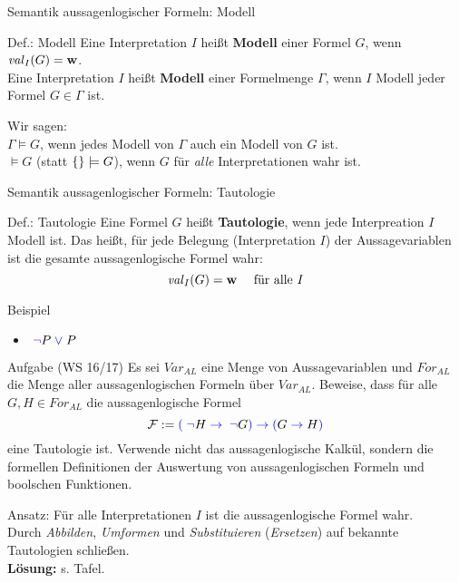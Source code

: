\begin{frame}{Semantik aussagenlogischer Formeln: Modell}
	\begin{block}{Def.: Modell}
		Eine Interpretation $I$ heißt \textbf{Modell} einer Formel $G$, wenn $\hbox{\textit{val}}_I(G)=\mathbf{w}$.\\[2ex]

		Eine Interpretation $I$ heißt \textbf{Modell} einer Formelmenge $\Gamma$, wenn $I$ Modell jeder Formel $G\in \Gamma$ ist.
	\end{block}

	\begin{exampleblock}{}
	Wir sagen:\\
	\textcolor{black!50!red}{$\Gamma \models G$}, wenn jedes Modell von $\Gamma$ auch ein Modell von $G$ ist.\\
	\textcolor{black!50!red}{$\models G$} (statt \textcolor{black!50!red}{$\{  \}\models G$}), wenn $G$ für \emph{alle} Interpretationen wahr ist.
	\end{exampleblock}
\end{frame}

\begin{frame}{Semantik aussagenlogischer Formeln: Tautologie}
	\begin{block}{Def.: Tautologie}
		Eine Formel $G$ heißt \textbf{Tautologie}, wenn jede Interpreation $I$ Modell ist. Das heißt, für jede Belegung (Interpretation $I$) der Aussagevariablen ist die gesamte aussagenlogische Formel wahr:
			\[	\hbox{\textit{val}}_I(G)=\mathbf{w} \quad \text{ für alle } I	\]
	\end{block}

	\begin{exampleblock}{Beispiel}
		\begin{itemize}
			\item \( \text{\;}\textcolor{blue}{\neg}\text{}{} P \text{\;}\textcolor{blue}{\vee}\text{\;} P \)
		\end{itemize}
	\end{exampleblock}
\end{frame}


\begin{frame}{}
	\begin{exampleblock}{Aufgabe (WS 16/17)}
		Es sei \(Var_{AL}\) eine Menge von Aussagevariablen und \(For_{AL}\) die Menge aller aussagenlogischen Formeln über \(Var_{AL}\). Beweise, dass für alle \(G, H \in For_{AL}\) die aussagenlogische Formel
				\[\mathcal{F} :=	\textcolor{blue}{(}\text{}{} \text{\;}\textcolor{blue}{\neg}\text{}{} H\text{\;}\textcolor{blue}{\to}\text{\;}{} \text{\;}\textcolor{blue}{\neg}\text{}{} G \textcolor{blue}{)}\text{}{} \text{\;}\textcolor{blue}{\to}\text{\;}{} \textcolor{blue}{(}\text{}{} G \text{\;}\textcolor{blue}{\to}\text{\;}{} H \textcolor{blue}{)}\text{}{}\]
		eine Tautologie ist. Verwende nicht das aussagenlogische Kalkül, sondern die formellen Definitionen der Auswertung von aussagenlogischen Formeln und boolschen Funktionen.
	\end{exampleblock}
	\begin{block}{Ansatz:}
		\zz Für alle Interpretationen $I$ ist die aussagenlogische Formel wahr.\\[1ex]
		Durch \emph{Abbilden}, \emph{Umformen} und \emph{Substituieren} (\emph{Ersetzen}) auf bekannte Tautologien schließen.\\[1ex]
		\textbf{Lösung:} s. Tafel.
	\end{block}
\end{frame}

